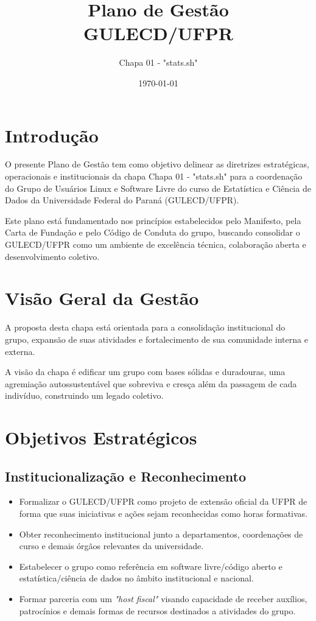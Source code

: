 \documentclass[11pt,a4paper]{article}
\title{\textbf{Plano de Gestão \\ GULECD/UFPR}}
\author{Chapa 01 - "stats.sh"}
\date{\today}
\begin{document}
\maketitle

\section{Introdução}

O presente Plano de Gestão tem como objetivo delinear as diretrizes estratégicas, operacionais e institucionais da chapa Chapa 01 - "stats.sh" para a coordenação do Grupo de Usuários Linux e Software Livre do curso de Estatística e Ciência de Dados da Universidade Federal do Paraná (GULECD/UFPR).

Este plano está fundamentado nos princípios estabelecidos pelo Manifesto, pela Carta de Fundação e pelo Código de Conduta do grupo, buscando consolidar o GULECD/UFPR como um ambiente de excelência técnica, colaboração aberta e desenvolvimento coletivo.

\section{Visão Geral da Gestão}

A proposta desta chapa está orientada para a consolidação institucional do grupo, expansão de suas atividades e fortalecimento de sua comunidade interna e externa. 

A visão da chapa é edificar um grupo com bases sólidas e duradouras, uma agremiação autossustentável que sobreviva e cresça além da passagem de cada indivíduo, construindo um legado coletivo.

\section{Objetivos Estratégicos}

\subsection{Institucionalização e Reconhecimento}

\begin{itemize}
    \item Formalizar o GULECD/UFPR como projeto de extensão oficial da UFPR de forma que suas iniciativas e ações sejam reconhecidas como horas formativas.
    \item Obter reconhecimento institucional junto a departamentos, coordenações de curso e demais órgãos relevantes da universidade.
    \item Estabelecer o grupo como referência em software livre/código aberto e estatística/ciência de dados no âmbito institucional e nacional.
    \item Formar parceria com um \textit{"host fiscal"} visando capacidade de receber auxílios, patrocínios e demais formas de recursos destinados a atividades do grupo.
\end{itemize}
\end{document}
